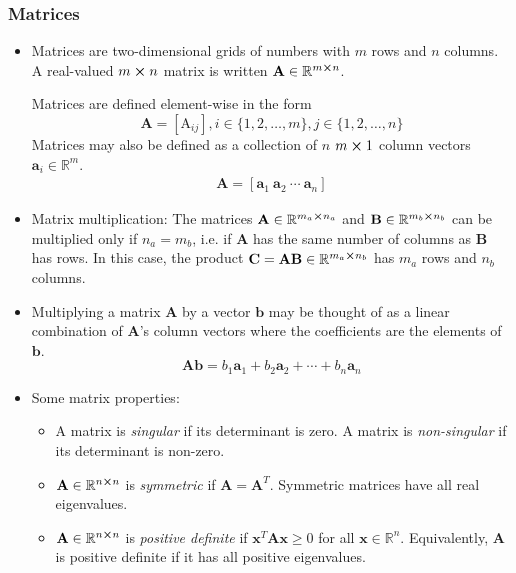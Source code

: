 \documentclass[11pt, a4paper]{article}
\newcommand{\R}{\mathbb{R}} %
\newcommand{\mat}[1]{\mathbf{#1}} %
\begin{document}
\subsubsection{Matrices}
\begin{itemize}
	\item Matrices are two-dimensional grids of numbers with $ m $ rows and $ n $ columns. A real-valued $ m \cross n $ matrix is written $ \mat{A} \in \R^{m\cross n} $. 
	
	Matrices are defined element-wise in the form 
	\begin{equation*}
		 \mat{A} = [\mathrm{A}_{ij}],  i \in \{1, 2, \dots, m\}, j \in \{1,2, \dots, n\} 
	\end{equation*}
	Matrices may also be defined as a collection of $ n $  $ m \cross 1 $ column vectors $ \bm{a}_i \in \R^{m} $.
	\begin{align*}
		\mat{A} = [\bm{a}_1 \ \bm{a}_2 \ \cdots \ \bm{a}_n]
	\end{align*}
	
	\item Matrix multiplication: The matrices $ \mat{A} \in \R^{m_{a} \cross n_{a}}$ and $ \mathbf{B} \in \R^{m_{b} \cross n_{b}} $ can be multiplied only if $ n_{a} = m_{b} $, i.e. if $ \mat{A} $ has the same number of columns as $ \mathbf{B} $ has rows. In this case, the product $ \mat{C} = \mat{A} \mat{B} \in \R^{m_{a} \cross n_{b}} $ has $ m_{a} $ rows and $ n_{b} $ columns.
	
	\item Multiplying a matrix $ \mathbf{A} $ by a vector $ \bm{b} $ may be thought of as a linear combination of $ \mat{A} $'s column vectors where the coefficients are the elements of $ \bm{b} $.
	\begin{equation*}
		\mat{A} \bm{b} = b_1 \bm{a}_1 + b_2 \bm{a}_2 + \cdots + b_n \bm{a}_n
	\end{equation*}
	
	\item Some matrix properties:
	\begin{itemize}
		\item A matrix is \textit{singular} if its determinant is zero. A matrix is \textit{non-singular} if its determinant is non-zero.
		
		\item $ \mat{A} \in \R^{n \cross n} $ is \textit{symmetric} if $ \mat{A} = \mat{A}^{T} $. Symmetric matrices have all real eigenvalues.
		
		\item  $ \mat{A} \in \R^{n \cross n} $ is \textit{positive definite} if $ \bm{x}^{T} \mat{A} \bm{x} \geq 0 $ for all $ \bm{x} \in \R^{n} $. Equivalently, $ \mat{A} $ is positive definite if it has all positive eigenvalues.
		

\end{itemize}
\end{itemize}
\end{document}
